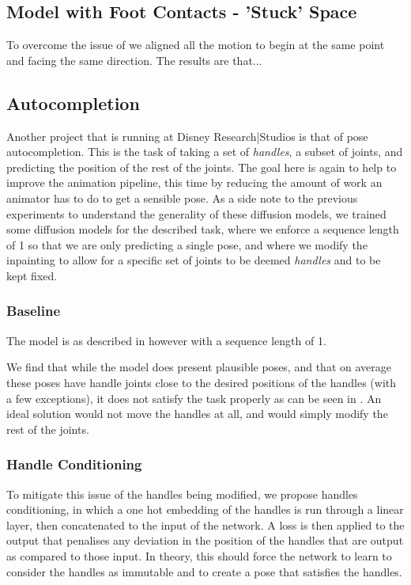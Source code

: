 \subsection{Model with Foot Contacts - 'Stuck' Space}

To overcome the issue of  we aligned all the motion to begin at the same point and facing the same direction. The results are that...

\subsection{Autocompletion}
\label{sec:autocomplete}

Another project that is running at Disney Research|Studios is that of pose autocompletion. This is the task of taking a set of \textit{handles}, a subset of joints, and predicting the position of the rest of the joints. The goal here is again to help to improve the animation pipeline, this time by reducing the amount of work an animator has to do to get a sensible pose. As a side note to the previous experiments to understand the generality of these diffusion models, we trained some diffusion models for the described task, where we enforce a sequence length of 1 so that we are only predicting a single pose, and where we modify the inpainting to allow for a specific set of joints to be deemed \textit{handles} and to be kept fixed.

\subsubsection{Baseline}
The model is as described in  however with a sequence length of 1.

We find that while the model does present plausible poses, and that on average these poses have handle joints close to the desired positions of the handles (with a few exceptions), it does not satisfy the task properly as can be seen in . An ideal solution would not move the handles at all, and would simply modify the rest of the joints.



\subsubsection{Handle Conditioning}
To mitigate this issue of the handles being modified, we propose handles conditioning, in which a one hot embedding of the handles is run through a linear layer, then concatenated to the input of the network. A loss is then applied to the output that penalises any deviation in the position of the handles that are output as compared to those input. In theory, this should force the network to learn to consider the handles as immutable and to create a pose that satisfies the handles.


